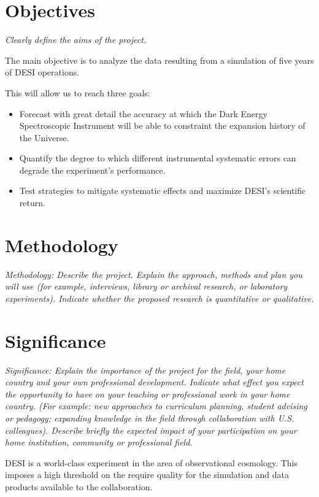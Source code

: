 \documentclass[12pt]{article}
\begin{document}
{}





\section*{Objectives}
\textit{Clearly define the aims of the project.}

The main objective is to analyze the data resulting from a simulation
of five years of DESI operations.  

This will allow us to reach three goals:
\begin{itemize}
\item Forecast with great detail the accuracy at which the Dark Energy
  Spectroscopic Instrument will be able to constraint the expansion
  history of the Universe.  
\item Quantify the degree to which different instrumental systematic
  errors can degrade the experiment's performance.
\item Test strategies to mitigate systematic effects and maximize
  DESI's scientific return.
\end{itemize}
\section*{Methodology}
\textit{Methodology: Describe the project. Explain the approach, methods and
plan you will use (for example, interviews, library or archival
research, or laboratory experiments). Indicate whether the proposed
research is quantitative or qualitative. }



\section*{Significance}
\textit{Significance: Explain the importance of the project for the field,
your home country and your own professional development. Indicate
what effect you expect the opportunity to have on your teaching or
professional work in your home country. (For example: new approaches
to curriculum planning, student advising or pedagogy; expanding
knowledge in the field through collaboration with
U.S. colleagues). Describe briefly the expected impact of your
participation on your home institution, community or professional
field. }

DESI is a world-class experiment in the area of observational
cosmology. 
This imposes a high threshold on the require quality for the
simulation and data products available to the collaboration. 
\end{document}
